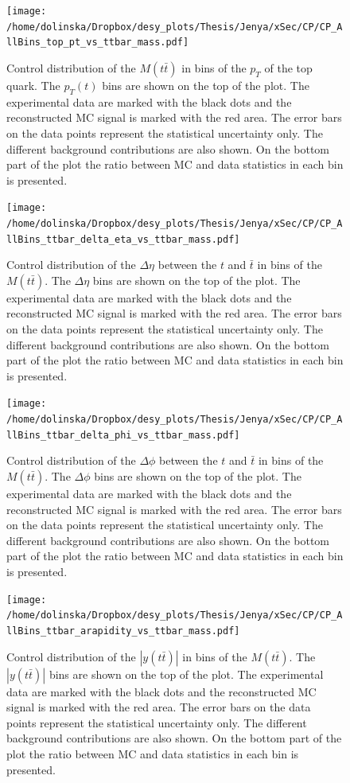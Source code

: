 \begin{figure}[p]
  \centering
  \texttt{[image: /home/dolinska/Dropbox/desy\_plots/Thesis/Jenya/xSec/CP/CP\_AllBins\_top\_pt\_vs\_ttbar\_mass.pdf]}
  \caption{Control distribution of the $M(t\bar{t})$ in bins of the $p_{T}$ of the top quark. The $p_{T}(t)$ bins are shown on the top 
  of the plot. The experimental data are marked with the black dots and the reconstructed MC signal is marked with the red area. The error
  bars on the data points represent the statistical uncertainty only. The 
  different background contributions are also shown. On the bottom part of the plot the ratio between MC and data statistics in each bin
  is presented.}
  \label{fig:CP_2D_Mtt_pt}
\end{figure}

\begin{figure}[p]
  \centering
  \texttt{[image: /home/dolinska/Dropbox/desy\_plots/Thesis/Jenya/xSec/CP/CP\_AllBins\_ttbar\_delta\_eta\_vs\_ttbar\_mass.pdf]}
  \caption{Control distribution of the $\Delta\eta$ between the $t$ and $\bar{t}$ in bins of the $M(t\bar{t})$. The $\Delta\eta$ bins are shown on the top 
  of the plot. The experimental data are marked with the black dots and the reconstructed MC signal is marked with the red area. The error
  bars on the data points represent the statistical uncertainty only. The 
  different background contributions are also shown. On the bottom part of the plot the ratio between MC and data statistics in each bin
  is presented.}
  \label{fig:CP_2D_eta_Mtt}
\end{figure}

\begin{figure}[p]
  \centering
  \texttt{[image: /home/dolinska/Dropbox/desy\_plots/Thesis/Jenya/xSec/CP/CP\_AllBins\_ttbar\_delta\_phi\_vs\_ttbar\_mass.pdf]}
  \caption{Control distribution of the $\Delta\phi$ between the $t$ and $\bar{t}$ in bins of the $M(t\bar{t})$. The $\Delta\phi$ bins are shown on the top 
  of the plot. The experimental data are marked with the black dots and the reconstructed MC signal is marked with the red area. The error
  bars on the data points represent the statistical uncertainty only. The 
  different background contributions are also shown. On the bottom part of the plot the ratio between MC and data statistics in each bin
  is presented.}
  \label{fig:CP_2D_phi_Mtt}
\end{figure}

\begin{figure}[p]
  \centering
  \texttt{[image: /home/dolinska/Dropbox/desy\_plots/Thesis/Jenya/xSec/CP/CP\_AllBins\_ttbar\_arapidity\_vs\_ttbar\_mass.pdf]}
  \caption{Control distribution of the $|y(t\bar{t})|$ in bins of the $M(t\bar{t})$. The $|y(t\bar{t})|$ bins are shown on the top 
  of the plot. The experimental data are marked with the black dots and the reconstructed MC signal is marked with the red area. The error
  bars on the data points represent the statistical uncertainty only. The 
  different background contributions are also shown. On the bottom part of the plot the ratio between MC and data statistics in each bin
  is presented.}
  \label{fig:CP_2D_ytt_Mtt}
\end{figure}

